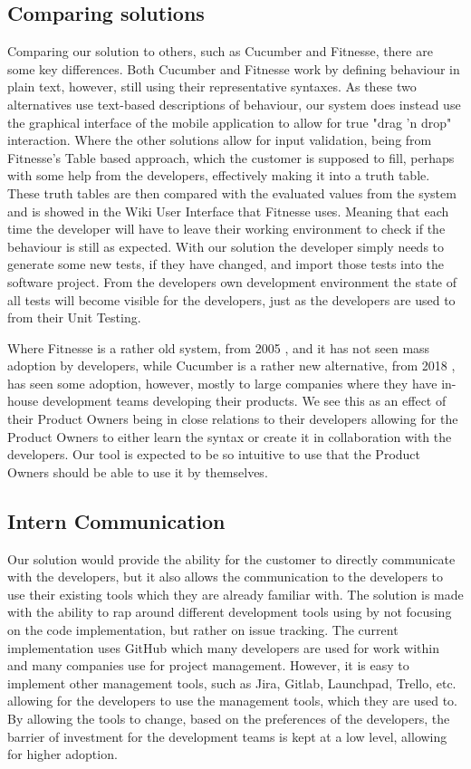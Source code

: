 \subsection{Comparing solutions}

Comparing our solution to others, such as Cucumber and Fitnesse, there are some key differences.
Both Cucumber and Fitnesse work by defining behaviour in plain text, however, still using their representative syntaxes.
As these two alternatives use text-based descriptions of behaviour, our system does instead use the graphical interface of the mobile application to allow for true "drag 'n drop" interaction.
Where the other solutions allow for input validation, being from Fitnesse's Table based approach, which the customer is supposed to fill, perhaps with some help from the developers, effectively making it into a truth table.
These truth tables are then compared with the evaluated values from the system and is showed in the Wiki User Interface that Fitnesse uses.
Meaning that each time the developer will have to leave their working environment to check if the behaviour is still as expected.
With our solution the developer simply needs to generate some new tests, if they have changed, and import those tests into the software project.
From the developers own development environment the state of all tests will become visible for the developers, just as the developers are used to from their Unit Testing.

Where Fitnesse is a rather old system, from 2005 \cite{FitnesseDownload}, and it has not seen mass adoption by developers, while Cucumber is a rather new alternative, from 2018 \cite{CucumberWiki}, has seen some adoption, however, mostly to large companies where they have in-house development teams developing their products.
We see this as an effect of their Product Owners being in close relations to their developers allowing for the Product Owners to either learn the syntax or create it in collaboration with the developers.
Our tool is expected to be so intuitive to use that the Product Owners should be able to use it by themselves.

\subsection{Intern Communication}

Our solution would provide the ability for the customer to directly communicate with the developers, but it also allows the communication to the developers to use their existing tools which they are already familiar with.
The solution is made with the ability to rap around different development tools using by not focusing on the code implementation, but rather on issue tracking.
The current implementation uses GitHub which many developers are used for work within and many companies use for project management.
However, it is easy to implement other management tools, such as Jira, Gitlab, Launchpad, Trello, etc. allowing for the developers to use the management tools, which they are used to.
By allowing the tools to change, based on the preferences of the developers, the barrier of investment for the development teams is kept at a low level, allowing for higher adoption.